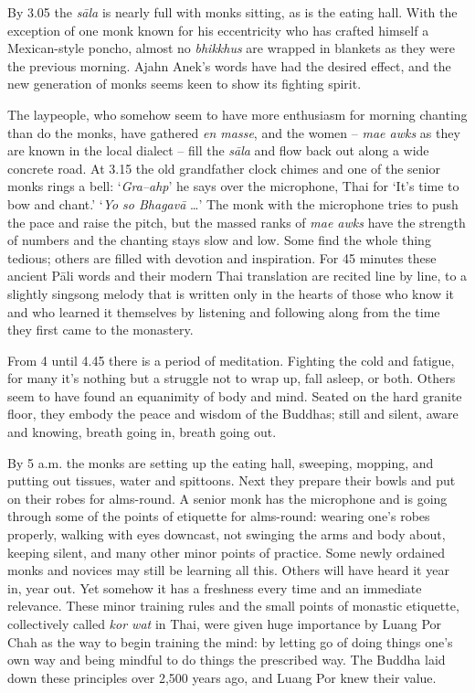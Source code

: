 By 3.05 the \emph{sāla} is nearly full with monks sitting, as is the eating
hall. With the exception of one monk known for his eccentricity who has
crafted himself a Mexican-style poncho, almost no \emph{bhikkhus} are wrapped
in blankets as they were the previous morning. Ajahn Anek's words have
had the desired effect, and the new generation of monks seems keen to
show its fighting spirit. 

The laypeople, who somehow seem to have more enthusiasm for morning
chanting than do the monks, have gathered \emph{en masse}, and the women
-- \emph{mae awks} as they are known in the local dialect -- fill the
\emph{sāla} and flow back out along a wide concrete road. At 3.15 the old
grandfather clock chimes and one of the senior monks rings a bell: 
`\emph{Gra--ahp}' he says over the microphone, Thai for `It's time to
bow and chant.' `\emph{Yo so Bhagavā} \ldots{}' The monk with the
microphone tries to push the pace and raise the pitch, but the massed
ranks of \emph{mae awks} have the strength of numbers and the chanting
stays slow and low. Some find the whole thing tedious; others are filled
with devotion and inspiration. For 45 minutes these ancient Pāli words
and their modern Thai translation are recited line by line, to a
slightly singsong melody that is written only in the hearts of those who
know it and who learned it themselves by listening and following along
from the time they first came to the monastery. 

From 4 until 4.45 there is a period of meditation. Fighting the cold and
fatigue, for many it's nothing but a struggle not to wrap up, fall
asleep, or both. Others seem to have found an equanimity of body and
mind. Seated on the hard granite floor, they embody the peace and wisdom
of the Buddhas; still and silent, aware and knowing, breath going in, 
breath going out. 

By 5 a.m. the monks are setting up the eating hall, sweeping, mopping, 
and putting out tissues, water and spittoons. Next they prepare their
bowls and put on their robes for alms-round. A senior
monk has the microphone and is going through some of the points of
etiquette for alms-round: wearing one's robes properly, walking with
eyes downcast, not swinging the arms and body about, keeping silent, and
many other minor points of practice. Some newly ordained monks and
novices may still be learning all this. Others will have heard it year
in, year out. Yet somehow it has a freshness every time and an immediate
relevance. These minor training rules and the small points of monastic
etiquette, collectively called \emph{kor wat} in Thai, were given huge
importance by Luang Por Chah as the way to begin training the mind: by
letting go of doing things one's own way and being mindful to do things
the prescribed way. The Buddha laid down these principles over 2,500
years ago, and Luang Por knew their value. 

